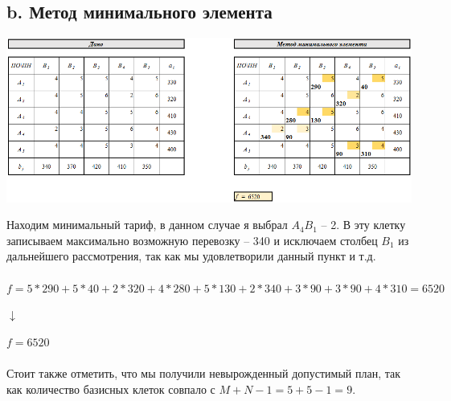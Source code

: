 \documentclass[14pt,a4paper,fleqn]{extarticle}
\begin{document}
\subsection*{b. Метод минимального элемента}
\begin{center}
	\includegraphics[scale=0.51]{3}
\end{center}
Находим минимальный тариф, в данном случае я выбрал $A_4B_1$ -- 2. В эту клетку записываем максимально возможную перевозку -- 340 и исключаем столбец $B_1$ из дальнейшего рассмотрения, так как мы удовлетворили данный пункт и т.д.\\\\
\small $f = 5*290+5*40+2*320+4*280+5*130+2*340+3*90+3*90+4*310 = 6520$
\begin{center}
	$\downarrow$
\end{center}
$f = 6520$\\\\
Стоит также отметить, что мы получили невырожденный допустимый план, так как количество базисных клеток совпало с $M+N-1 = 5+5-1 = 9$.
\newpage
\end{document}
